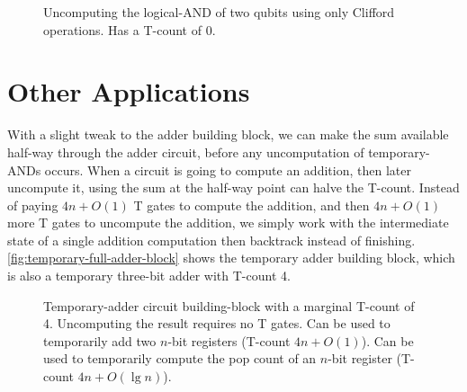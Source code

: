 \documentclass[twocolumn,longbibliography]{quantumarticle-customized}
\newcommand{\qH}{\gate{H}}
\begin{document}
\begin{figure}
  \resizebox{\linewidth}{!}{
    \Qcircuit @R=0.7em @C=0.7em {
      &x  &&\ctrl{1} &\qw &x && &&\qw &\qw    &\ctrl{1} &\qw \\
      &y  &&\ctrl{1} &\qw &y &&=&&\qw &\qw    &\gate{Z} &\qw \\
      &xy &&\qw      &    &  && &&\qH &\meter &\cw \cwx \bullet &    \\
    }
  }
  \caption{
	Uncomputing the logical-AND of two qubits using only Clifford operations.
    Has a T-count of 0.
  }
  \label{fig:erase-logical-AND}
\end{figure}


\section{Other Applications}
\label{sec:other-applications}

With a slight tweak to the adder building block, we can make the sum available half-way through the adder circuit, before any uncomputation of temporary-ANDs occurs.
When a circuit is going to compute an addition, then later uncompute it, using the sum at the half-way point can halve the T-count.
Instead of paying $4n + O(1)$ T gates to compute the addition, and then $4n + O(1)$ more T gates to uncompute the addition, we simply work with the intermediate state of a single addition computation then backtrack instead of finishing.
\autoref{fig:temporary-full-adder-block} shows the temporary adder building block, which is also a temporary three-bit adder with T-count 4.

\begin{figure}
  \caption{
	Temporary-adder circuit building-block with a marginal T-count of 4.
	Uncomputing the result requires no T gates.
	Can be used to temporarily add two $n$-bit registers (T-count $4n + O(1)$).
	Can be used to temporarily compute the pop count of an $n$-bit register (T-count $4n + O(\lg n)$).
  }
  \label{fig:temporary-full-adder-block}
\end{figure}
\end{document}
